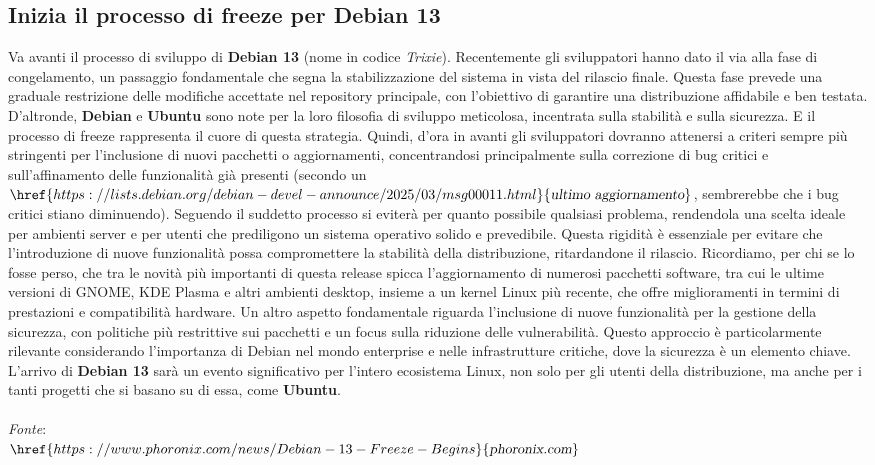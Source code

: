 \documentclass[a4paper,twoside]{article}
\begin{document}
\subsection{Inizia il processo di freeze per Debian 13}
Va avanti il processo di sviluppo di \textbf{Debian 13} (nome in codice \textit{Trixie}). Recentemente gli sviluppatori hanno dato il via alla fase di congelamento, un passaggio fondamentale che segna la stabilizzazione del sistema in vista del rilascio finale. Questa fase prevede una graduale restrizione delle modifiche accettate nel repository principale, con l'obiettivo di garantire una distribuzione affidabile e ben testata. D'altronde, \textbf{Debian} e \textbf{Ubuntu} sono note per la loro filosofia di sviluppo meticolosa, incentrata sulla stabilità e sulla sicurezza. E il processo di freeze rappresenta il cuore di questa strategia. Quindi, d'ora in avanti gli sviluppatori dovranno attenersi a criteri sempre più stringenti per l'inclusione di nuovi pacchetti o aggiornamenti, concentrandosi principalmente sulla correzione di bug critici e sull'affinamento delle funzionalità già presenti (secondo un $\href{https://lists.debian.org/debian-devel-announce/2025/03/msg00011.html}{\textsl{ultimo aggiornamento}}$, sembrerebbe che i bug critici stiano diminuendo). Seguendo il suddetto processo si eviterà per quanto possibile qualsiasi problema, rendendola una scelta ideale per ambienti server e per utenti che prediligono un sistema operativo solido e prevedibile. Questa rigidità è essenziale per evitare che l'introduzione di nuove funzionalità possa compromettere la stabilità della distribuzione, ritardandone il rilascio.
Ricordiamo, per chi se lo fosse perso, che tra le novità più importanti di questa release spicca l'aggiornamento di numerosi pacchetti software, tra cui le ultime versioni di GNOME, KDE Plasma e altri ambienti desktop, insieme a un kernel Linux più recente, che offre miglioramenti in termini di prestazioni e compatibilità hardware. Un altro aspetto fondamentale riguarda l'inclusione di nuove funzionalità per la gestione della sicurezza, con politiche più restrittive sui pacchetti e un focus sulla riduzione delle vulnerabilità. Questo approccio è particolarmente rilevante considerando l'importanza di Debian nel mondo enterprise e nelle infrastrutture critiche, dove la sicurezza è un elemento chiave. L'arrivo di \textbf{Debian 13} sarà un evento significativo per l'intero ecosistema Linux, non solo per gli utenti della distribuzione, ma anche per i tanti progetti che si basano su di essa, come \textbf{Ubuntu}.\\
\\
\textit{Fonte}:\\
$\href{https://www.phoronix.com/news/Debian-13-Freeze-Begins}{\textsl{phoronix.com}}$
\end{document}
